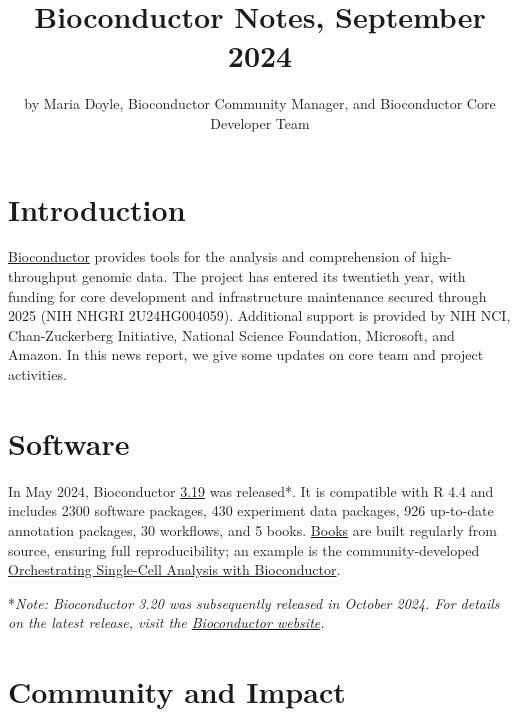 \title{Bioconductor Notes, September 2024}


\author{by Maria Doyle, Bioconductor Community Manager, and Bioconductor Core Developer Team}

\maketitle


\hypertarget{introduction}{%
\section{Introduction}\label{introduction}}

\href{https://bioconductor.org}{Bioconductor} provides
tools for the analysis and comprehension of high-throughput genomic
data. The project has entered its twentieth year, with funding
for core development and infrastructure maintenance secured
through 2025 (NIH NHGRI 2U24HG004059). Additional support is provided
by NIH NCI, Chan-Zuckerberg Initiative, National Science Foundation,
Microsoft, and Amazon. In this news report, we give some updates on
core team and project activities.

\hypertarget{software}{%
\section{Software}\label{software}}

In May 2024, Bioconductor \href{https://bioconductor.org/news/bioc_3_19_release/}{3.19} was released*. It is compatible with R 4.4 and includes 2300 software packages, 430 experiment data packages, 926 up-to-date annotation packages, 30 workflows, and 5 books. \href{https://bioconductor.org/books/release/}{Books} are built regularly from source, ensuring full reproducibility; an example is the community-developed \href{https://bioconductor.org/books/release/OSCA/}{Orchestrating Single-Cell Analysis with Bioconductor}.

*\emph{Note: Bioconductor 3.20 was subsequently released in October 2024. For details on the latest release, visit the \href{https://bioconductor.org/news/}{Bioconductor website}.}

\hypertarget{community-and-impact}{%
\section{Community and Impact}\label{community-and-impact}}

